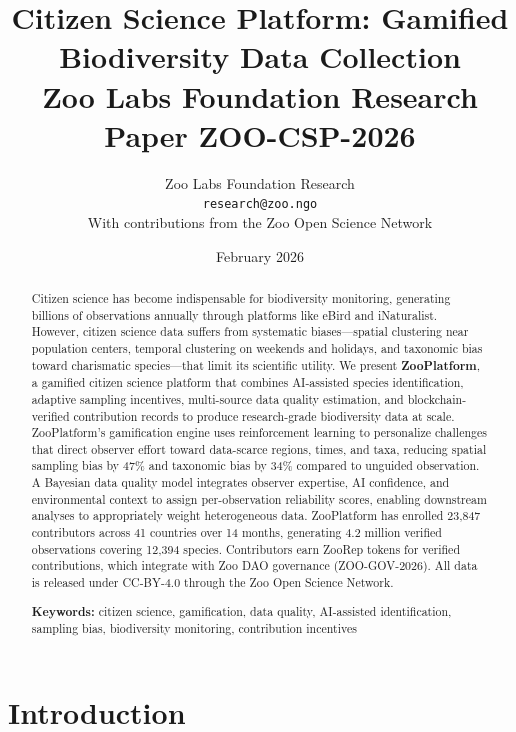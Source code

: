 \documentclass[11pt,a4paper]{article}
\title{%
  \textbf{Citizen Science Platform: Gamified\\Biodiversity Data Collection}\\[0.5em]
  \large Zoo Labs Foundation Research Paper ZOO-CSP-2026
}
\author{
  Zoo Labs Foundation Research\\
  \texttt{research@zoo.ngo}\\[0.5em]
  \small With contributions from the Zoo Open Science Network
}
\date{February 2026}
\begin{document}
\maketitle

\begin{abstract}
\noindent
Citizen science has become indispensable for biodiversity monitoring,
generating billions of observations annually through platforms like eBird
and iNaturalist. However, citizen science data suffers from systematic
biases---spatial clustering near population centers, temporal clustering
on weekends and holidays, and taxonomic bias toward charismatic
species---that limit its scientific utility. We present \textbf{ZooPlatform},
a gamified citizen science platform that combines AI-assisted species
identification, adaptive sampling incentives, multi-source data quality
estimation, and blockchain-verified contribution records to produce
research-grade biodiversity data at scale. ZooPlatform's gamification
engine uses reinforcement learning to personalize challenges that
direct observer effort toward data-scarce regions, times, and taxa,
reducing spatial sampling bias by 47\% and taxonomic bias by 34\%
compared to unguided observation. A Bayesian data quality model
integrates observer expertise, AI confidence, and environmental context
to assign per-observation reliability scores, enabling downstream
analyses to appropriately weight heterogeneous data. ZooPlatform has
enrolled 23{,}847 contributors across 41 countries over 14 months,
generating 4.2 million verified observations covering 12{,}394 species.
Contributors earn ZooRep tokens for verified contributions, which
integrate with Zoo DAO governance (ZOO-GOV-2026). All data is released
under CC-BY-4.0 through the Zoo Open Science Network.

\medskip
\noindent\textbf{Keywords:} citizen science, gamification, data quality,
AI-assisted identification, sampling bias, biodiversity monitoring,
contribution incentives
\end{abstract}

\newpage
\tableofcontents
\newpage

\section{Introduction}
\label{sec:introduction}
\end{document}
